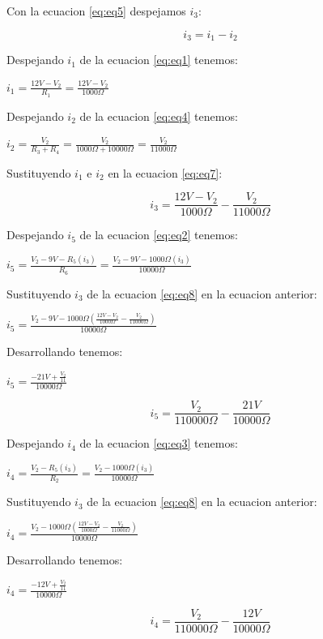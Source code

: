 \documentclass[12pt, letterpaper]{article}
\begin{document}
Con la ecuacion \ref{eq:eq5} despejamos \(i_3\):

\begin{equation}
i_3 = i_1 - i_2
\label{eq:eq7}
\end{equation}

Despejando \(i_1\) de la ecuacion \ref{eq:eq1} tenemos:

\(i_1 = \frac{12V - V_2}{R_1} = \frac{12V - V_2}{1000 \Omega}\)

Despejando \(i_2\) de la ecuacion \ref{eq:eq4} tenemos:

\(i_2 = \frac{V_2}{R_3+R_4} = \frac{V_2}{1000 \Omega + 10000 \Omega} = \frac{V_2}{11000 \Omega}\)

Sustituyendo \(i_1\) e \(i_2\) en la ecuacion \ref{eq:eq7}:

\begin{equation}
i_3 = \frac{12V - V_2}{1000 \Omega} - \frac{V_2}{11000 \Omega}
\label{eq:eq8}
\end{equation}

Despejando \(i_5\) de la ecuacion \ref{eq:eq2} tenemos:

\(i_5 = \frac{V_2 - 9V - R_5(i_3)}{R_6} = \frac{V_2 - 9V - 1000 \Omega (i_3)}{10000 \Omega}\)

Sustituyendo \(i_3\) de la ecuacion \ref{eq:eq8} en la ecuacion anterior:

\(i_5 = \frac{V_2 - 9V - 1000 \Omega \left( \frac{12V - V_2}{1000 \Omega} - \frac{V_2}{11000 \Omega} \right)}{10000 \Omega}\)

Desarrollando tenemos:

\(i_5 = \frac{-21V+\frac{V_2}{11}}{10000 \Omega}\)

\begin{equation}
i_5 = \frac{V_2}{110000 \Omega} - \frac{21V}{10000 \Omega}
\label{eq:eq9}
\end{equation}

Despejando \(i_4\) de la ecuacion \ref{eq:eq3} tenemos:

\(i_4 = \frac{V_2 - R_5(i_3)}{R_2} = \frac{V_2 - 1000 \Omega (i_3)}{10000 \Omega}\)

Sustituyendo \(i_3\) de la ecuacion \ref{eq:eq8} en la ecuacion anterior:

\(i_4 = \frac{V_2 - 1000 \Omega \left( \frac{12V - V_2}{1000 \Omega} - \frac{V_2}{11000 \Omega} \right)}{10000 \Omega}\)

Desarrollando tenemos:

\(i_4 = \frac{-12V + \frac{V_2}{11}}{10000 \Omega}\)

\begin{equation}
i_4 = \frac{V_2}{110000 \Omega} - \frac{12V}{10000 \Omega}
\label{eq:eq10}
\end{equation}
\end{document}
